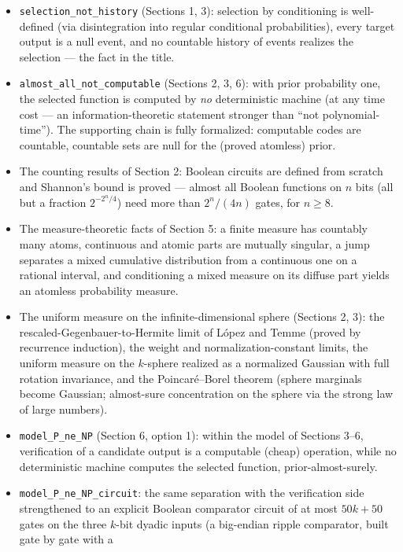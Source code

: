\documentclass[11pt,a4paper]{report}
\begin{document}
\begin{itemize}
\item
  \texttt{selection\_not\_history} (Sections 1, 3): selection by
  conditioning is well-defined (via disintegration into regular
  conditional probabilities), every target output is a null event, and no
  countable history of events realizes the selection --- the fact in the
  title.
\item
  \texttt{almost\_all\_not\_computable} (Sections 2, 3, 6): with prior
  probability one, the selected function is computed by \emph{no}
  deterministic machine (at any time cost --- an information-theoretic
  statement stronger than ``not polynomial-time''). The supporting chain
  is fully formalized: computable codes are countable, countable sets are
  null for the (proved atomless) prior.
\item
  The counting results of Section 2: Boolean circuits are defined from
  scratch and Shannon's bound is proved --- almost all Boolean functions
  on \(n\) bits (all but a fraction \(2^{-2^{n}/4}\)) need more than
  \(2^{n}/(4n)\) gates, for \(n \geq 8\).
\item
  The measure-theoretic facts of Section 5: a finite measure has
  countably many atoms, continuous and atomic parts are mutually
  singular, a jump separates a mixed cumulative distribution from a
  continuous one on a rational interval, and conditioning a mixed measure
  on its diffuse part yields an atomless probability measure.
\item
  The uniform measure on the infinite-dimensional sphere (Sections 2, 3):
  the rescaled-Gegenbauer-to-Hermite limit of L\'opez and Temme (proved
  by recurrence induction), the weight and normalization-constant limits,
  the uniform measure on the \(k\)-sphere realized as a normalized
  Gaussian with full rotation invariance, and the Poincar\'e--Borel
  theorem (sphere marginals become Gaussian; almost-sure concentration on
  the sphere via the strong law of large numbers).
\item
  \texttt{model\_P\_ne\_NP} (Section 6, option 1): within the model of
  Sections 3--6, verification of a candidate output is a computable
  (cheap) operation, while no deterministic machine computes the selected
  function, prior-almost-surely.
\item
  \texttt{model\_P\_ne\_NP\_circuit}: the same separation with the
  verification side strengthened to an explicit Boolean comparator
  circuit of at most \(50k + 50\) gates on the three \(k\)-bit dyadic
  inputs (a big-endian ripple comparator, built gate by gate with a

\end{itemize}
\end{document}
